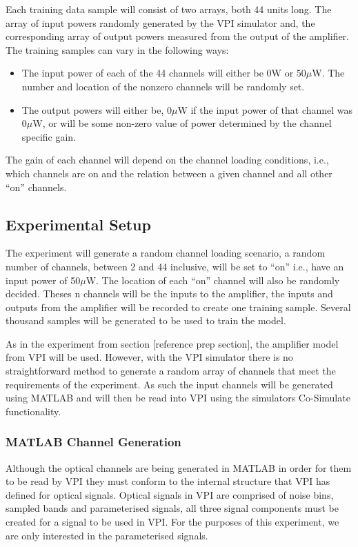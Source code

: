 Each training data sample will consist of two arrays, both 44 units long. The array of input powers randomly generated by the VPI simulator and, the corresponding array of output powers measured from the output of the amplifier. The training samples can vary in the following ways:
\begin{itemize}
    \item The input power of each of the 44 channels will either be 0W or 50$\mu$W. The number and location of the nonzero channels will be randomly set.
    
    \item The output powers will either be, 0$\mu$W if the input power of that channel was 0$\mu$W, or will be some non-zero value of power determined by the channel specific gain.
\end{itemize}

The gain of each channel will depend on the channel loading conditions, i.e., which channels are on and the relation between a given channel and all other “on” channels.




\subsection{Experimental Setup}


The experiment will generate a random channel loading scenario, a random number of channels, between 2 and 44 inclusive, will be set to “on” i.e., have an input power of 50$\mu$W. The location of each “on” channel will also be randomly decided. 
Theses n channels will be the inputs to the amplifier, the inputs and outputs from the amplifier will be recorded to create one training sample. Several thousand samples will be generated to be used to train the model. 

As in the experiment from section [reference prep section], the amplifier model from VPI will be used. However, with the VPI simulator there is no straightforward method to generate a random array of channels that meet the requirements of the experiment. 
As such the input channels will be generated using MATLAB and will then be read into VPI using the simulators Co-Simulate functionality. 


\subsubsection{MATLAB Channel Generation}

Although the optical channels are being generated in MATLAB in order for them to be read by VPI they must conform to the internal structure that VPI has defined for optical signals. 
Optical signals in VPI are comprised of noise bins, sampled bands and parameterised signals, all three signal components must be created for a signal to be used in VPI. 
For the purposes of this experiment, we are only interested in the parameterised signals.

